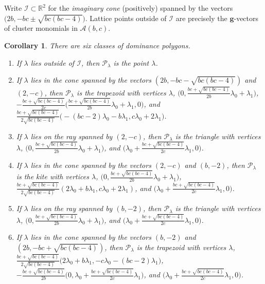 \documentclass[pdflatex,sn-mathphys]{sn-jnl}%
\theoremstyle{thmstyleone}%
\newtheorem{corollary}[theorem]{Corollary}
\theoremstyle{thmstyletwo}%
\theoremstyle{thmstylethree}%
\newcommand{\bfg}{\boldsymbol{g}}
\newcommand{\cA}{\mathcal{A}}
\newcommand{\cI}{\mathcal{I}}
\newcommand{\cP}{\mathcal{P}}
\newcommand{\RR}{\mathbb{R}}
\begin{document}
  Write $\cI \subset \RR^2$ for the \emph{imaginary cone} (positively) spanned by the vectors $\big(2b,-bc\pm\sqrt{bc(bc-4)}\big)$.
  Lattice points outside of $\cI$ are precisely the $\bfg$-vectors of cluster monomials in $\cA(b,c)$.
  \begin{corollary}
    \label{cor:dominance vertices}
    There are six classes of dominance polygons.
    \begin{enumerate}
      \item If $\lambda$ lies outside of $\cI$, then $\cP_\lambda$ is the point $\lambda$. 
      \item If $\lambda$ lies in the cone spanned by the vectors $(2b,-bc-\sqrt{bc(bc-4)})$ and $(2,-c)$, then $\cP_\lambda$ is the trapezoid with  vertices $\lambda$, $\big(0,\frac{bc+\sqrt{bc(bc-4)}}{2b}\lambda_0+\lambda_1\big)$, $-\frac{bc+\sqrt{bc(bc-4)}}{2c}\big(\frac{bc+\sqrt{bc(bc-4)}}{2b}\lambda_0+\lambda_1,0\big)$, and ${\frac{bc+\sqrt{bc(bc-4)}}{2\sqrt{bc(bc-4)}}\big(-(bc-2)\lambda_0-b\lambda_1,c\lambda_0+2\lambda_1\big)}$.
      \item If $\lambda$ lies on the ray spanned by $(2,-c)$, then $\cP_\lambda$ is the triangle with vertices $\lambda$, $\big(0,\frac{bc+\sqrt{bc(bc-4)}}{2b}\lambda_0+\lambda_1\big)$, and $\big(\lambda_0+\frac{bc+\sqrt{bc(bc-4)}}{2c}\lambda_1,0\big)$.
      \item If $\lambda$ lies in the cone spanned by the vectors $(2,-c)$ and $(b,-2)$, then $\cP_\lambda$ is the kite with  vertices $\lambda$, $\big(0,\frac{bc+\sqrt{bc(bc-4)}}{2b}\lambda_0+\lambda_1\big)$, $\frac{bc+\sqrt{bc(bc-4)}}{2\sqrt{bc(bc-4)}}(2\lambda_0+b\lambda_1,c\lambda_0+2\lambda_1)$, and $\big(\lambda_0+\frac{bc+\sqrt{bc(bc-4)}}{2c}\lambda_1,0\big)$.
      \item If $\lambda$ lies on the ray spanned by $(b,-2)$, then $\cP_\lambda$ is the triangle with vertices $\lambda$, $\big(0,\frac{bc+\sqrt{bc(bc-4)}}{2b}\lambda_0+\lambda_1\big)$, and $\big(\lambda_0+\frac{bc+\sqrt{bc(bc-4)}}{2c}\lambda_1,0\big)$.
      \item If $\lambda$ lies in the cone spanned by the vectors $(b,-2)$ and $(2b,-bc+\sqrt{bc(bc-4)})$, then $\cP_\lambda$ is the trapezoid with vertices $\lambda$, $\frac{bc+\sqrt{bc(bc-4)}}{2\sqrt{bc(bc-4)}}\big(2\lambda_0+b\lambda_1,-c\lambda_0-(bc-2)\lambda_1\big)$, $-\frac{bc+\sqrt{bc(bc-4)}}{2b}\big(0,\lambda_0+\frac{bc+\sqrt{bc(bc-4)}}{2c}\lambda_1\big)$, and $\big(\lambda_0+\frac{bc+\sqrt{bc(bc-4)}}{2c}\lambda_1,0\big)$.
    \end{enumerate}
  \end{corollary}
\end{document}
